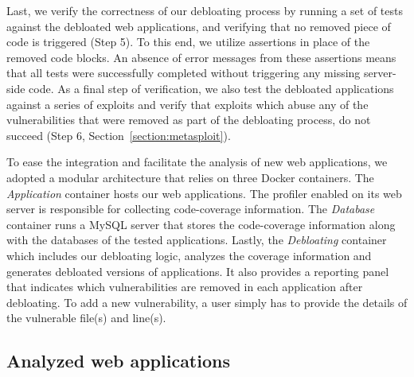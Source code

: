Last, we verify the correctness of our debloating process by running
a set of tests against the debloated web applications, and verifying that
no removed piece of code is triggered (Step 5). To this end, we
utilize assertions in place of the removed code blocks. An absence of error
messages from these assertions means that all tests were successfully
completed without triggering any missing server-side code. As a final step of
verification, we also test the debloated applications against a series of
exploits and verify that exploits which
abuse any of the vulnerabilities that were removed as part of the debloating
process, do not succeed (Step 6, Section~\ref{section:metasploit}).

To ease the integration and facilitate the analysis of new web applications, we
adopted a modular architecture that relies on three Docker containers. The
\textit{Application} container hosts our web applications.  The profiler
enabled on its web server is responsible for collecting code-coverage
information. The \textit{Database} container runs a MySQL server that
stores the code-coverage information along with the databases of the tested
applications. Lastly, the \textit{Debloating} container which includes our
debloating logic, analyzes the coverage information and generates debloated
versions of applications. It also provides a reporting panel that indicates
which vulnerabilities are removed in each application after debloating. To add
a new vulnerability, a user simply has to provide the details of the vulnerable
file(s) and line(s).



\subsection{Analyzed web applications}
\label{subsec:webapps}


